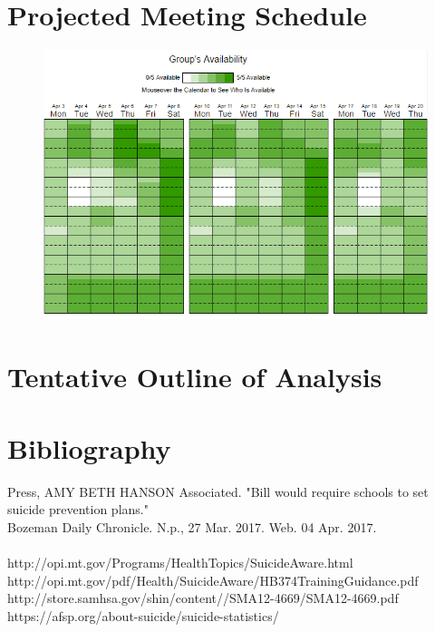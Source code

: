 \documentclass[10pt,letterpaper]{article}
\begin{document}
\section*{Projected Meeting Schedule}
\begin{figure}[h]
		\includegraphics[scale = .5]{groupaval.png}
  		\label{fig:aval}
	\end{figure}

\section*{Tentative Outline of Analysis}

\section*{Bibliography}

Press, AMY BETH HANSON Associated. "Bill would require schools to set suicide prevention plans."\\ Bozeman Daily Chronicle. N.p., 27 Mar. 2017. Web. 04 Apr. 2017.\\
\\
http://opi.mt.gov/Programs/HealthTopics/SuicideAware.html \\
http://opi.mt.gov/pdf/Health/SuicideAware/HB374TrainingGuidance.pdf \\
http://store.samhsa.gov/shin/content//SMA12-4669/SMA12-4669.pdf \\
https://afsp.org/about-suicide/suicide-statistics/ \\
\end{document}
